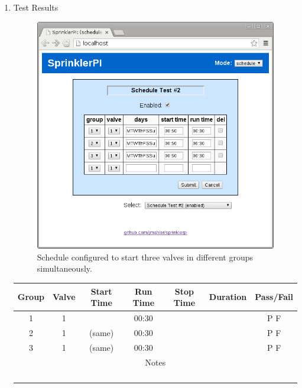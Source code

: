 \documentclass{article}
\begin{document}
\begin{enumerate}
\item Test Results \\
	\vspace{1em}
	\begin{figure}[hbp!]
	\begin{center}
	\includegraphics[scale=0.5]{img/www-schedule_test2}
	\end{center}
	\caption{Schedule configured to start three valves in different groups
		simultaneously.}
	\label{fig:www-schedule_test2}
	\end{figure}

	\vspace{1em}
	\begin{center}
	\begin{tabular}{|c|c|c|c|c|c|c|}
		\hline
		Group & Valve & Start Time & Run Time & Stop Time & Duration & Pass/Fail \\
		\hline
		1 & 1 & & 00:30 & & & P \quad F \\
		\hline
		2 & 1 & (same) & 00:30 & & & P \quad F \\
		\hline
		3 & 1 & (same) & 00:30 & & & P \quad F \\
		\hline
		\hline
		\multicolumn{7}{|c|}{Notes} \\
		\multicolumn{7}{|c|}{} \\
		\multicolumn{7}{|c|}{} \\
		\multicolumn{7}{|c|}{} \\
		\multicolumn{7}{|c|}{} \\
		\hline
	\end{tabular}
	\end{center}

\end{enumerate}




\clearpage
\printbibliography[heading=bibintoc]
\end{document}
